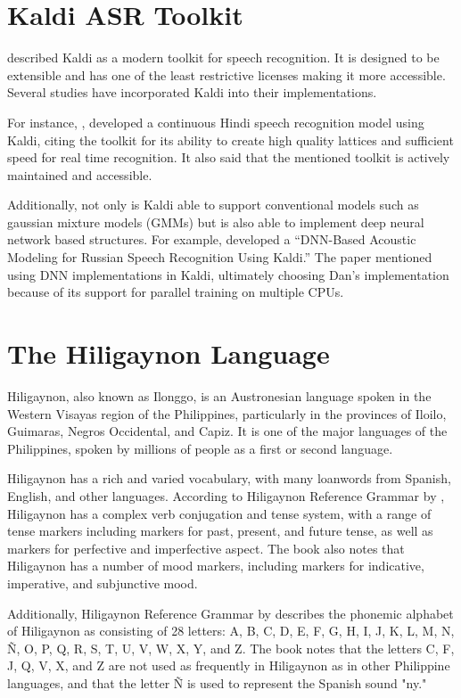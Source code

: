 \section{Kaldi ASR Toolkit}
\citeauthor{povey-2011} \citeyear{povey-2011} described Kaldi as a modern toolkit for speech recognition. It is designed to be extensible and has one of the least restrictive licenses making it more accessible. Several studies have incorporated Kaldi into their implementations. 

For instance, \citeauthor{upadhyaya-2017} \citeyear{upadhyaya-2017} , developed a continuous Hindi speech recognition model using Kaldi, citing the toolkit for its ability to create high quality lattices and sufficient speed for real time recognition. It also said that the mentioned toolkit is actively maintained and accessible. 

Additionally, not only is Kaldi able to support conventional models such as gaussian mixture models (GMMs) but is also able to implement deep neural network based structures. For example, \citeauthor{kipyatkova-2016} \citeyear{kipyatkova-2016} developed a “DNN-Based Acoustic Modeling for Russian Speech Recognition Using Kaldi.” The paper mentioned using DNN implementations in Kaldi, ultimately choosing Dan’s implementation because of its support for parallel training on multiple CPUs.


\section{The Hiligaynon Language}
Hiligaynon, also known as Ilonggo, is an Austronesian language spoken in the Western Visayas region of the Philippines, particularly in the provinces of Iloilo, Guimaras, Negros Occidental, and Capiz. It is one of the major languages of the Philippines, spoken by millions of people as a first or second language.

Hiligaynon has a rich and varied vocabulary, with many loanwords from Spanish, English, and other languages. According to Hiligaynon Reference Grammar by \citeauthor{wolfenden-2019} \citeyear{wolfenden-2019}, Hiligaynon has a complex verb conjugation and tense system, with a range of tense markers including markers for past, present, and future tense, as well as markers for perfective and imperfective aspect. The book also notes that Hiligaynon has a number of mood markers, including markers for indicative, imperative, and subjunctive mood.

Additionally, Hiligaynon Reference Grammar by \citeauthor{wolfenden-2019} \citeyear{wolfenden-2019} describes the phonemic alphabet of Hiligaynon as consisting of 28 letters: A, B, C, D, E, F, G, H, I, J, K, L, M, N, Ñ, O, P, Q, R, S, T, U, V, W, X, Y, and Z. The book notes that the letters C, F, J, Q, V, X, and Z are not used as frequently in Hiligaynon as in other Philippine languages, and that the letter Ñ is used to represent the Spanish sound "ny."

